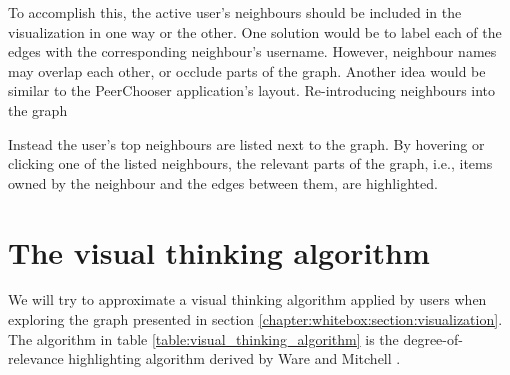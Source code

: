 To accomplish this, the active user's neighbours should be included in the visualization in one way or the other. One solution would be to label each of the edges with the corresponding neighbour's username. However, neighbour names may overlap each other, or occlude parts of the graph. Another idea would be similar to the PeerChooser application's layout. Re-introducing neighbours into the graph

Instead the user's top neighbours are listed next to the graph. By hovering or clicking one of the listed neighbours, the relevant parts of the graph, i.e., items owned by the neighbour and the edges between them, are highlighted.




\section{The visual thinking algorithm}\label{chapter:whitebox:section:algorithm}

We will try to approximate a visual thinking algorithm applied by users when exploring the graph presented in section \ref{chapter:whitebox:section:visualization}. The algorithm in table \ref{table:visual_thinking_algorithm} is the degree-of-relevance highlighting algorithm derived by Ware and Mitchell \cite{ware:2004}.

